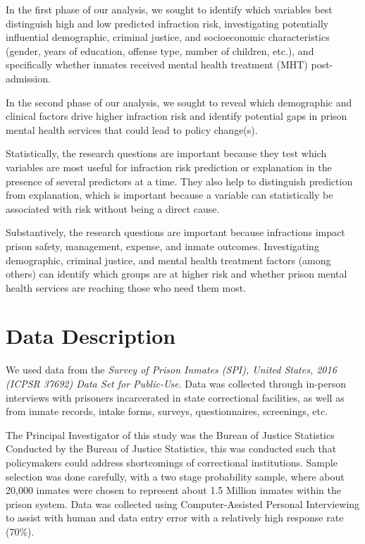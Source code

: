 \documentclass[
]{article}
\begin{document}
In the first phase of our analysis, we sought to identify which
variables best distinguish high and low predicted infraction risk,
investigating potentially influential demographic, criminal justice, and
socioeconomic characteristics (gender, years of education, offense type,
number of children, etc.), and specifically whether inmates received
mental health treatment (MHT) post-admission.

In the second phase of our analysis, we sought to reveal which
demographic and clinical factors drive higher infraction risk and
identify potential gaps in prison mental health services that could lead
to policy change(s).

Statistically, the research questions are important because they test
which variables are most useful for infraction risk prediction or
explanation in the presence of several predictors at a time. They also
help to distinguish prediction from explanation, which is important
because a variable can statistically be associated with risk without
being a direct cause.

Substantively, the research questions are important because infractions
impact prison safety, management, expense, and inmate outcomes.
Investigating demographic, criminal justice, and mental health treatment
factors (among others) can identify which groups are at higher risk and
whether prison mental health services are reaching those who need them
most.

\section{Data Description}\label{data-description}

We used data from the \emph{Survey of Prison Inmates (SPI), United
States, 2016 (ICPSR 37692) Data Set for Public-Use}. Data was collected
through in-person interviews with prisoners incarcerated in state
correctional facilities, as well as from inmate records, intake forms,
surveys, questionnaires, screenings, etc.

The Principal Investigator of this study was the Bureau of Justice
Statistics Conducted by the Bureau of Justice Statistics, this was
conducted such that policymakers could address shortcomings of
correctional institutions. Sample selection was done carefully, with a
two stage probability sample, where about 20,000 inmates were chosen to
represent about 1.5 Million inmates within the prison system. Data was
collected using Computer-Assisted Personal Interviewing to assist with
human and data entry error with a relatively high response rate (70\%).
\end{document}
